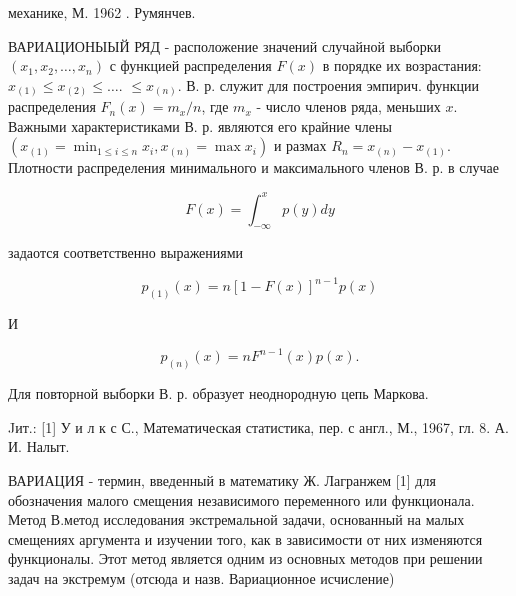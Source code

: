 \documentclass[10pt]{article}
\begin{document}
механике, М. 1962 . Румянчев.

ВАРИАЦИОНЫЫЙ РЯД - расположение значений случайной выборки $\left(x_{1}, x_{2}, \ldots, x_{n}\right)$ с функцией распределения $F(x)$ в порядке их возрастания: $x_{(1)} \leqslant x_{(2)} \leqslant \ldots$. $\leqslant x_{(n)}$. В. р. служит для построения эмпирич. функции распределения $F_{n}(x)=m_{x} / n$, где $m_{x}$ - число членов ряда, меньших $x$. Важными характеристиками В. р. являются его крайние члены $\left(x_{(1)}=\min _{1 \leqslant i \leqslant n} x_{i}, x_{(n)}=\max x_{i}\right)$ и размах $R_{n}=x_{(n)}-x_{(1)}$. Плотности распределения минимального и максимального членов В. р. в случае



\[

F(x)=\int_{-\infty}^{x} p(y) d y

\]



задаотся соответственно выражениями



\[

p_{(1)}(x)=n[1-F(x)]^{n-1} p(x)

\]



И



\[

p_{(n)}(x)=n F^{n-1}(x) p(x) .

\]



Для повторной выборки В. р. образует неоднородную цепь Маркова.



Jит.: [1] У и л к с С., Математическая статистика, пер. с англ., М., 1967, гл. 8. А. И. Налыт.



ВАРИАЦИЯ - термин, введенный в математику Ж. Лагранжем [1] для обозначения малого смещения независимого переменного или функционала. Метод В.метод исследования экстремальной задачи, основанный на малых смещениях аргумента и изучении того, как в зависимости от них изменяются функционалы. Этот метод является одним из основных методов при решении задач на экстремум (отсюда и назв. Вариационное исчисление)
\end{document}
